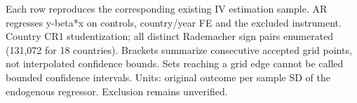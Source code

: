 \begin{table}[htbp]\centering
\caption{Weak-instrument robust null tests and finite-grid inversion}
\label{tab:identification_ar}
\small
{}
\begin{tablenotes}\footnotesize Each row reproduces the corresponding existing IV estimation sample. AR regresses y-beta*x on controls, country/year FE and the excluded instrument. Country CR1 studentization; all distinct Rademacher sign pairs enumerated (131,072 for 18 countries). Brackets summarize consecutive accepted grid points, not interpolated confidence bounds. Sets reaching a grid edge cannot be called bounded confidence intervals. Units: original outcome per sample SD of the endogenous regressor. Exclusion remains unverified.\end{tablenotes}
\end{table}